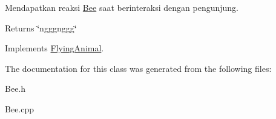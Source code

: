 Mendapatkan reaksi \hyperlink{classBee}{Bee} saat berinteraksi dengan pengunjung. 

\begin{DoxyReturn}{Returns}
\char`\"{}ngggnggg\char`\"{} 
\end{DoxyReturn}


Implements \hyperlink{classFlyingAnimal_ac0eee625fa2235eee8cbdc0a010ae430}{Flying\-Animal}.



The documentation for this class was generated from the following files\-:\begin{DoxyCompactItemize}
\item 
Bee.\-h\item 
Bee.\-cpp\end{DoxyCompactItemize}
